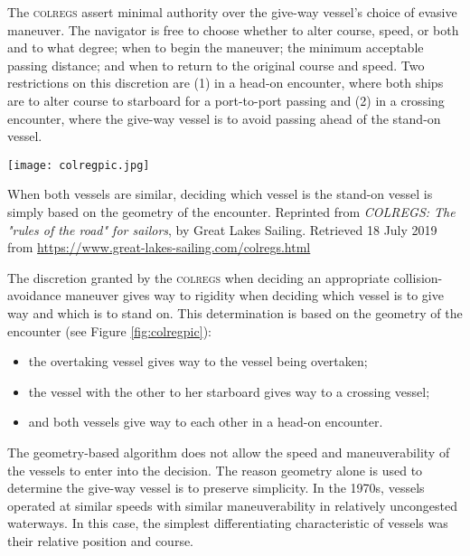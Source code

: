 \documentclass[twoside,symmetric,notoc]{tufte-book}
\begin{document}
\par{%
The \textsc{colregs} assert minimal authority over the give-way vessel's choice of evasive maneuver. The navigator is free to choose whether to alter course, speed, or both and to what degree; when to begin the maneuver; the minimum acceptable passing distance; and when to return to the original course and speed. Two restrictions on this discretion are (1) in a head-on encounter, where both ships are to alter course to starboard for a port-to-port passing and (2) in a crossing encounter, where the give-way vessel is to avoid passing ahead of the stand-on vessel.\cite[-1in]{Plant}
}
\begin{marginfigure}[-2\baselineskip]
	\texttt{[image: colregpic.jpg]}
	\caption[When both vessels are similar, deciding which vessel is the stand-on vessel is simply based on the geometry of the encounter]{When both vessels are similar, deciding which vessel is the stand-on vessel is simply based on the geometry of the encounter. Reprinted from \textit{COLREGS: The "rules of the road" for sailors}, by Great Lakes Sailing. Retrieved 18 July 2019 from \url{https://www.great-lakes-sailing.com/colregs.html}}
	\label{fig:colregpic}
\end{marginfigure} 
\par{%
The discretion granted by the \textsc{colregs} when deciding an appropriate collision-avoidance maneuver gives way to rigidity when deciding which vessel is to give way and which is to stand on. This determination is based on the geometry of the encounter (see Figure \ref{fig:colregpic}): 
\begin{itemize}
    \item the overtaking vessel gives way to the vessel being overtaken;
    \item the vessel with the other to her starboard gives way to a crossing vessel; 
    \item and both vessels give way to each other in a head-on encounter.
\end{itemize} The geometry-based algorithm does not allow the speed and maneuverability of the vessels to enter into the decision.\cite{Plant} The reason geometry alone is used to determine the give-way vessel is to preserve simplicity. In the 1970s, vessels operated at similar speeds with similar maneuverability in relatively uncongested waterways. In this case, the simplest differentiating characteristic of vessels was their relative position and course.
}
\end{document}
